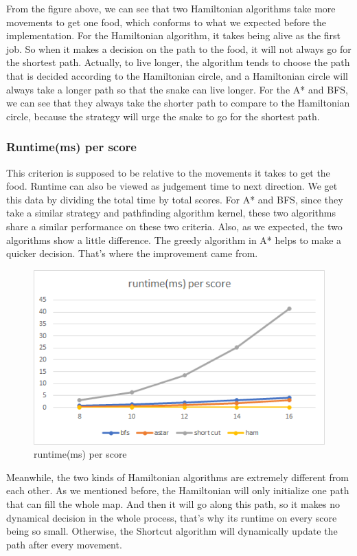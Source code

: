 \documentclass[12pt]{article}
\begin{document}
From the figure above, we can see that two Hamiltonian algorithms take more movements to get one food, which conforms to what we expected before the implementation. For the Hamiltonian algorithm, it takes being alive as the first job. So when it makes a decision on the path to the food, it will not always go for the shortest path. Actually, to live longer, the algorithm tends to choose the path that is decided according to the Hamiltonian circle, and a Hamiltonian circle will always take a longer path so that the snake can live longer. For the A* and BFS, we can see that they always take the shorter path to compare to the Hamiltonian circle, because the strategy will urge the snake to go for the shortest path. 

\subsubsection{Runtime(ms) per score}

This criterion is supposed to be relative to the movements it takes to get the food. Runtime can also be viewed as judgement time to next direction. We get this data by dividing the total time by total scores. For A* and BFS, since they take a similar strategy and pathfinding algorithm kernel, these two algorithms share a similar performance on these two criteria. Also, as we expected, the two algorithms show a little difference. The greedy algorithm in A* helps to make a quicker decision. That's where the improvement came from. 

\begin{figure}[H]
    \centering 
    \includegraphics[scale = 0.9]{anay2.png}
    \caption{runtime(ms) per score}
\end{figure}

Meanwhile, the two kinds of Hamiltonian algorithms are extremely different from each other. 
As we mentioned before, the Hamiltonian will only initialize one path that can fill the whole map. 
And then it will go along this path, so it makes no dynamical decision in the whole process, 
that's why its runtime on every score being so small. Otherwise, the Shortcut algorithm will 
dynamically update the path after every movement. 
\end{document}
